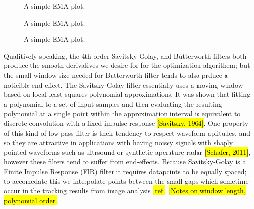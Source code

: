 \documentclass[10pt,a4paper]{article}
\begin{document}


\begin{figure}
    \centering
    
    \caption{A simple EMA plot.\label{fig:ema1}}
\end{figure}

\begin{figure}
    \centering
    
       \caption{A simple EMA plot.\label{fig:ema2}}
\end{figure}

\begin{figure}
    \centering
    
       \caption{A simple EMA plot.\label{fig:ema3}}
\end{figure}


Qualitively speaking, the 4th-order Savitsky-Golay, and Butterworth filters both produce the smooth derivatives we desire for for the optimization algorithem; but the small window-size needed for Butterworth filter tends to also prduce a noticible end effect. The Savitsky-Golay filter essentially uses a moving-window based on local least-squares polynomial approximations. It was shown that fitting a polynomial to a set of input samples and then evaluating the resulting polynomial at a single point within the approximation interval is equivalent to discrete convolution with a fixed impulse response \hl{[Savitsky, 1964]}. One property of this kind of low-pass filter is their tendency to respect waveform aplitudes, and so they are attractive in applications with having noisey signals with shaply pointed waveforms such as ultrsound or synthetic aperature radar \hl{[Schafer, 2011]}, however these filters tend to suffer from end-effects. Because Savitsky-Golay is a Finite Impulse Response (FIR) filter it requires datapoints to be equally spaced; to accomedate this we interpolate points between the small gaps which sometime occur in the tracking results from image analysis \hl{[ref]}. \hl{[Notes on window length, polynomial order]}.
\end{document}

